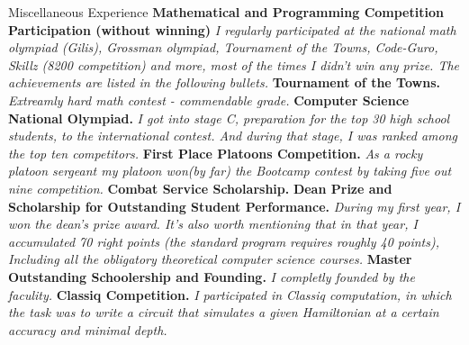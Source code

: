\begin{rubric}{Miscellaneous Experience}
\entry*[2012 -- 2014] \textbf{Mathematical and Programming Competition Participation (without winning)} \emph{I regularly participated at the national math olympiad (Gilis), Grossman olympiad, Tournament of the Towns, Code-Guro, Skillz (8200 competition) and more, most of the times I didn't win any prize. The achievements are listed in the following bullets.}
\entry*[2014] \textbf{Tournament of the Towns.} \emph{Extreamly hard math contest - commendable grade.}
\entry*[2014] \textbf{Computer Science National Olympiad.} \emph{I got into stage C, preparation for the top 30 high school students, to the international contest. And during that stage, I was ranked among the top ten competitors.}
\ifdefined\ARMY
\entry*[2017] \textbf{First Place Platoons Competition.} \emph{As a rocky platoon sergeant my platoon won(by far) the Bootcamp contest by taking five out nine competition.}     
\entry*[2018] \textbf{Combat Service Scholarship.}  
\fi
\entry*[2018] \textbf{Dean Prize and Scholarship for Outstanding Student Performance.} \emph{During my first year, I won the dean's prize award. It's also worth mentioning that in that year, I accumulated 70 right points (the standard program requires roughly 40 points), Including all the obligatory theoretical computer science courses. }
\entry*[2022] \textbf{Master Outstanding Schoolership and Founding.} \emph{I completly founded by the faculity.} 
\entry*[2022] \textbf{Classiq Competition.} \emph{I participated in Classiq computation, in which the task was to write a circuit that simulates a given Hamiltonian at a certain accuracy and minimal depth. } 
\end{rubric}

